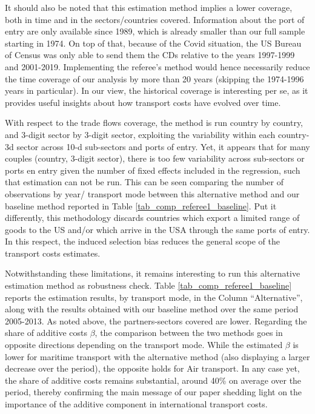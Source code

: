 \documentclass[11pt,twoside, authoryear]{elsarticle}
\begin{document}
It should also be noted that this estimation method implies a lower coverage, both in time and in the sectors/countries covered. Information about the port of entry are only available since 1989, which is already smaller than our full sample starting in 1974. On top of that, because of the Covid situation, the US Bureau of Census was only able to send them the CDs relative to the years 1997-1999 and 2001-2019. Implementing the referee's method would hence necessarily reduce the time coverage of our analysis by more than 20 years (skipping the 1974-1996 years in particular). In our view, the historical coverage is interesting per se, as it provides useful insights about how transport costs have evolved over time. 

With respect to the trade flows coverage, the method is run country by country, and 3-digit sector by 3-digit sector, exploiting the variability within each country-3d sector across 10-d sub-sectors and ports of entry. Yet, it appears that for many couples (country, 3-digit sector), there is too few variability across sub-sectors or ports en entry given the number of fixed effects included in the regression, such that estimation can not be run. This can be seen comparing the number of observations by year/ transport mode between this alternative method and our baseline method reported in Table \ref{tab_comp_referee1_baseline}. Put it differently, this methodology discards countries which export a limited range of goods to the US and/or which arrive in the USA through the same ports of entry. In this respect, the induced selection bias reduces the general scope of the transport costs estimates.

Notwithstanding these limitations, it remains interesting to run this alternative estimation method as robustness check. Table \ref{tab_comp_referee1_baseline} reports the estimation results, by transport mode, in the Column ``Alternative'', along with the results obtained with our baseline method over the same period 2005-2013. As noted above, the partners-sectors covered are lower. Regarding the share of additive costs $\beta$, the comparison between the two methods goes in opposite directions depending on the transport mode. While the estimated $\beta$ is lower for maritime transport with the alternative method (also displaying a larger decrease over the period), the opposite holds for Air transport. In any case yet, the share of additive costs remains substantial, around 40\% on average over the period, thereby confirming the main message of our paper shedding light on the importance of the additive component in international transport costs.
\end{document}
